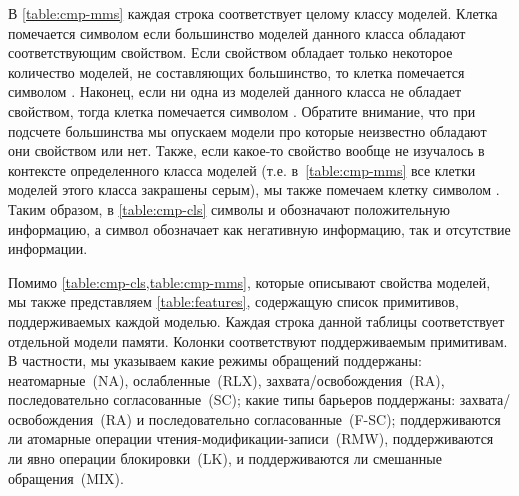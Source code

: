 В \cref{table:cmp-mms} каждая строка соответствует целому классу моделей. 
Клетка помечается символом \cmark\xspace если большинство моделей 
данного класса обладают соответствующим свойством. 
Если свойством обладает только некоторое количество моделей, 
не составляющих большинство, то клетка помечается символом \wmark\xspace.
Наконец, если ни одна из моделей данного класса не обладает свойством, 
тогда клетка помечается символом \xmark\xspace.
Обратите внимание, что при подсчете большинства 
мы опускаем модели про которые неизвестно обладают 
они свойством или нет. 
Также, если какое-то свойство вообще не изучалось 
в контексте определенного класса моделей 
(т.е. в~\cref{table:cmp-mms} все клетки моделей этого класса закрашены серым),
мы также помечаем клетку символом \xmark. 
Таким образом, в \cref{table:cmp-cls} символы \cmark\xspace и \wmark\xspace 
обозначают положительную информацию, а символ \xmark\xspace обозначает 
как негативную информацию, так и отсутствие информации. 

Помимо \cref{table:cmp-cls,table:cmp-mms}, 
которые описывают свойства моделей, мы также 
представляем \cref{table:features}, содержащую 
список примитивов, поддерживаемых каждой моделью. 
Каждая строка данной таблицы соответствует отдельной модели памяти.
Колонки соответствуют поддерживаемым примитивам. 
В частности, мы указываем какие режимы обращений поддержаны:
неатомарные~(NA), ослабленные~(RLX), захвата/освобождения~(RA), 
последовательно согласованные~(SC); 
какие типы барьеров поддержаны:
захвата/освобождения~(RA) и последовательно согласованные~(F-SC);
поддерживаются ли атомарные операции чтения-модификации-записи~(RMW),
поддерживаются ли явно операции блокировки~(LK),
и поддерживаются ли смешанные обращения~(MIX).   





